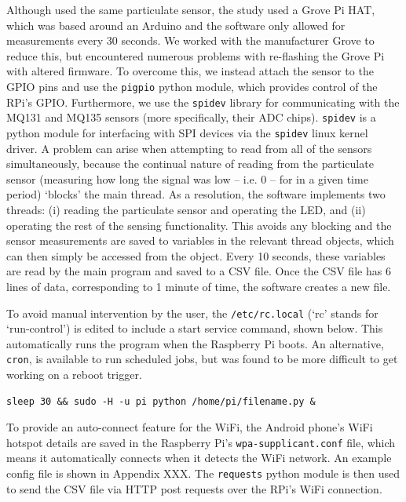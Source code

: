 \documentclass[11pt]{report}
\begin{document}
Although \cite{thorpe2017RPimesh} used the same particulate sensor, the study used a Grove Pi HAT, which was based around an Arduino and the software only allowed for measurements every 30 seconds. We worked with the manufacturer Grove to reduce this, but encountered numerous problems with re-flashing the Grove Pi with altered firmware. To overcome this, we instead attach the sensor to the GPIO pins and use the \texttt{pigpio} python module, which provides control of the RPi's GPIO. Furthermore, we use the \texttt{spidev} library for communicating with the MQ131 and MQ135 sensors (more specifically, their ADC chips). \texttt{spidev} is a python module for interfacing with SPI devices via the \texttt{spidev} linux kernel driver. A problem can arise when attempting to read from all of the sensors simultaneously, because the continual nature of reading from the particulate sensor (measuring how long the signal was low -- i.e. 0 -- for in a given time period) `blocks' the main thread. As a resolution, the software implements two threads: (i) reading the particulate sensor and operating the LED, and (ii) operating the rest of the sensing functionality. This avoids any blocking and the sensor measurements are saved to variables in the relevant thread objects, which can then simply be accessed from the object. Every 10 seconds, these variables are read by the main program and saved to a CSV file. Once the CSV file has 6 lines of data, corresponding to 1 minute of time, the software creates a new file.

To avoid manual intervention by the user, the \texttt{/etc/rc.local} (`rc' stands for `run-control') is edited to include a start service command, shown below. This automatically runs the program when the Raspberry Pi boots. An alternative, \texttt{cron}, is available to run scheduled jobs, but was found to be more difficult to get working on a reboot trigger.
\begin{lstlisting}
sleep 30 && sudo -H -u pi python /home/pi/filename.py &
\end{lstlisting}

To provide an auto-connect feature for the WiFi, the Android phone's WiFi hotspot details are saved in the Raspberry Pi's \texttt{wpa-supplicant.conf} file, which means it automatically connects when it detects the WiFi network. An example config file is shown in Appendix XXX. The \texttt{requests} python module is then used to send the CSV file via HTTP post requests over the RPi's WiFi connection.
\end{document}
